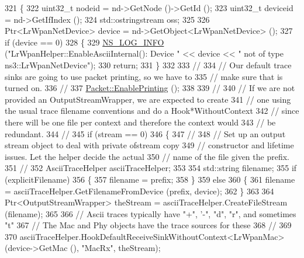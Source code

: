 \begin{DoxyCode}
321 \{
322   uint32\_t nodeid = nd->GetNode ()->GetId ();
323   uint32\_t deviceid = nd->GetIfIndex ();
324   std::ostringstream oss;
325 
326   Ptr<LrWpanNetDevice> device = nd->GetObject<LrWpanNetDevice> ();
327   \textcolor{keywordflow}{if} (device == 0)
328     \{
329       \hyperlink{group__logging_gafbd73ee2cf9f26b319f49086d8e860fb}{NS\_LOG\_INFO} (\textcolor{stringliteral}{"LrWpanHelper::EnableAsciiInternal(): Device "} << device << \textcolor{stringliteral}{" not of type
       ns3::LrWpanNetDevice"});
330       \textcolor{keywordflow}{return};
331     \}
332 
333   \textcolor{comment}{//}
334   \textcolor{comment}{// Our default trace sinks are going to use packet printing, so we have to}
335   \textcolor{comment}{// make sure that is turned on.}
336   \textcolor{comment}{//}
337   \hyperlink{classns3_1_1Packet_ae17c0cd8e63e83df3c9273801e3d5d7f}{Packet::EnablePrinting} ();
338 
339   \textcolor{comment}{//}
340   \textcolor{comment}{// If we are not provided an OutputStreamWrapper, we are expected to create}
341   \textcolor{comment}{// one using the usual trace filename conventions and do a Hook*WithoutContext}
342   \textcolor{comment}{// since there will be one file per context and therefore the context would}
343   \textcolor{comment}{// be redundant.}
344   \textcolor{comment}{//}
345   \textcolor{keywordflow}{if} (stream == 0)
346     \{
347       \textcolor{comment}{//}
348       \textcolor{comment}{// Set up an output stream object to deal with private ofstream copy}
349       \textcolor{comment}{// constructor and lifetime issues.  Let the helper decide the actual}
350       \textcolor{comment}{// name of the file given the prefix.}
351       \textcolor{comment}{//}
352       AsciiTraceHelper asciiTraceHelper;
353 
354       std::string filename;
355       \textcolor{keywordflow}{if} (explicitFilename)
356         \{
357           filename = prefix;
358         \}
359       \textcolor{keywordflow}{else}
360         \{
361           filename = asciiTraceHelper.GetFilenameFromDevice (prefix, device);
362         \}
363 
364       Ptr<OutputStreamWrapper> theStream = asciiTraceHelper.CreateFileStream (filename);
365 
366       \textcolor{comment}{// Ascii traces typically have "+", '-", "d", "r", and sometimes "t"}
367       \textcolor{comment}{// The Mac and Phy objects have the trace sources for these}
368       \textcolor{comment}{//}
369 
370       asciiTraceHelper.HookDefaultReceiveSinkWithoutContext<LrWpanMac> (device->GetMac (), \textcolor{stringliteral}{"MacRx"}, 
      theStream);

\end{DoxyCode}
